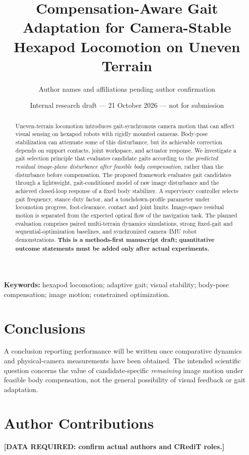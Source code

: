 \documentclass[11pt,a4paper]{article}
\title{Compensation-Aware Gait Adaptation for Camera-Stable Hexapod Locomotion on Uneven Terrain}
\author{Author names and affiliations pending author confirmation}
\date{Internal research draft --- 21 October 2026 --- not for submission}
\newcommand{\todoexp}[1]{\textcolor{red!70!black}{\textbf{[DATA REQUIRED: #1]}}}
\begin{document}
\maketitle
\begin{abstract}
Uneven-terrain locomotion introduces gait-synchronous camera motion that can affect visual sensing on hexapod robots with rigidly mounted cameras. Body-pose stabilization can attenuate some of this disturbance, but its achievable correction depends on support contacts, joint workspace, and actuator response. We investigate a gait selection principle that evaluates candidate gaits according to the \emph{predicted residual image-plane disturbance after feasible body compensation}, rather than the disturbance before compensation. The proposed framework evaluates gait candidates through a lightweight, gait-conditioned model of raw image disturbance and the achieved closed-loop response of a fixed body stabilizer. A supervisory controller selects gait frequency, stance duty factor, and a touchdown-profile parameter under locomotion progress, foot-clearance, contact and joint limits. Image-space residual motion is separated from the expected optical flow of the navigation task. The planned evaluation comprises paired multi-terrain dynamics simulations, strong fixed-gait and sequential-optimization baselines, and synchronized camera--IMU robot demonstrations. \textbf{This is a methods-first manuscript draft; quantitative outcome statements must be added only after actual experiments.}
\end{abstract}
\noindent\textbf{Keywords:} hexapod locomotion; adaptive gait; visual stability; body-pose compensation; image motion; constrained optimization.







\section{Conclusions}
A conclusion reporting performance will be written once comparative dynamics and physical-camera measurements have been obtained. The intended scientific question concerns the value of candidate-specific \emph{remaining} image motion under feasible body compensation, not the general possibility of visual feedback or gait adaptation.
\section*{Author Contributions}
\todoexp{confirm actual authors and CRediT roles.}
\end{document}
